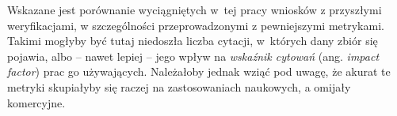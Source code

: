 Wskazane jest porównanie wyciągniętych w~tej pracy wniosków z przyszłymi weryfikacjami, w szczególności przeprowadzonymi z pewniejszymi metrykami.
Takimi mogłyby być tutaj niedoszła liczba cytacji, w~których dany zbiór się pojawia, albo -- nawet lepiej -- jego wpływ na \emph{wskaźnik cytowań} (ang. \emph{impact factor}) prac go używających.
Należałoby jednak wziąć pod uwagę, że akurat te metryki skupiałyby się raczej na zastosowaniach naukowych, a omijały komercyjne.
